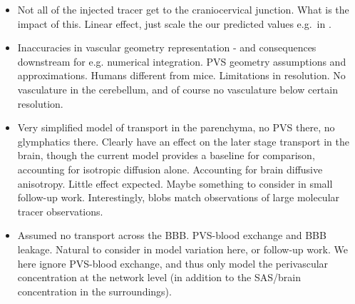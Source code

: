 \documentclass[fleqn,10pt]{wlscirep}
\newcommand{\draft}[1]{\textcolor{lightgray}{#1}}
\begin{document}
\begin{itemize}
\item
  Not all of the injected tracer get to the craniocervical
  junction. What is the impact of this. Linear effect, just scale the
  our predicted values e.g.~in .
\item 
  Inaccuracies in vascular geometry representation - and consequences
  downstream for e.g. numerical integration. PVS geometry assumptions
  and approximations. Humans different from mice. Limitations in
  resolution. No vasculature in the cerebellum, and of course no
  vasculature below certain resolution.
\item
  Very simplified model of transport in the parenchyma, no PVS there,
  no glymphatics there. Clearly have an effect on the later stage
  transport in the brain, though the current model provides a baseline
  for comparison, accounting for isotropic diffusion alone.
  Accounting for brain diffusive anisotropy. Little effect
  expected. Maybe something to consider in small follow-up
  work. Interestingly, blobs match observations of large molecular
  tracer observations.

\item
  Assumed no transport across the BBB. PVS-blood exchange and BBB
  leakage. Natural to consider in model variation here, or follow-up
  work. We here ignore PVS-blood exchange, and thus only model the
  perivascular concentration at the network level (in addition to the
  SAS/brain concentration in the surroundings).
\end{itemize}

\draft{\lipsum[1-2]}
\end{document}
